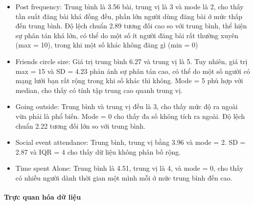    \begin{itemize}
    \item Post frequency: Trung bình là 3.56 bài, trung vị là 3 và mode là 2, cho thấy tần suất đăng bài khá đồng đều, phần lớn người dùng đăng bài ở mức thấp đến trung bình. Độ lệch chuẩn 2.89 tương đối cao so với trung bình, thể hiện sự phân tán khá lớn, có thể do một số ít người đăng bài rất thường xuyên (max = 10), trong khi một số khác không đăng gì (min = 0)
    
    \item Friends circle size: Giá trị trung bình 6.27 và trung vị là 5. Tuy nhiên, giá trị max = 15 và SD = 4.23 phản ánh sự phân tán cao, có thể do một số người có mạng lưới bạn rất rộng trong khi số khác thì không. Mode = 5 phù hợp với median, cho thấy có tính tập trung cao quanh trung vị.
    
    \item Going outside: Trung bình và trung vị đều là 3, cho thấy mức độ ra ngoài vừa phải là phổ biến. Mode = 0 cho thấy đa số không tích ra ngoài. Độ lệch chuẩn 2.22 tương đối lớn so với trung bình.
    
    \item Social event attendance: Trung bình, trung vị bằng 3.96 và mode = 2. SD = 2.87 và IQR = 4 cho thấy dữ liệu không phân bố rộng.
    
    \item Time spent Alone: Trung bình là 4.51, trung vị là 4, và mode = 0, cho thấy có nhiều người dành thời gian một mình mỗi ở mức trung bình đến cao.
    
    \end{itemize}

    \paragraph{Trực quan hóa dữ liệu}
    \leavevmode

